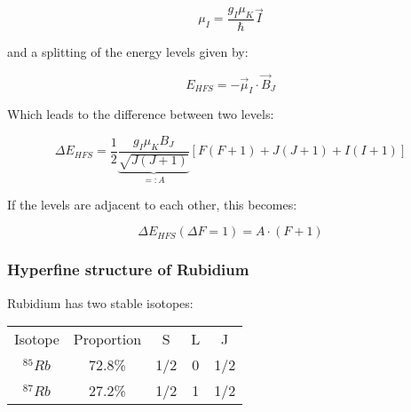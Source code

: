 $$\mu_I = \frac{g_I\mu_K}{\hbar}\vec I$$

and a splitting of the energy levels given by:

$$E_{HFS} = -\vec\mu_I\cdot\vec B_J$$

Which leads to the difference between two levels:

$$\Delta E_{HFS} = \frac{1}{2}\underbrace{\frac{g_I\mu_KB_J}{\sqrt{J(J+1)}}}_{=:A}[F(F+1) + J(J+1) + I(I+1)]$$

If the levels are adjacent to each other, this becomes:

\begin{equation} \Delta E_{HFS}(\Delta F = 1) = A\cdot (F+1) \end{equation} 

\subsubsection{Hyperfine structure of Rubidium}

Rubidium has two stable isotopes:

\begin{center}
\begin{tabular}[H]{c c c c c}
Isotope & Proportion &  S & L & J \\
 $^{85}Rb$ & 72.8\% & 1/2 & 0 & 1/2 \\
 $^{87}Rb$ & 27.2\% & 1/2 & 1 & 1/2 \\
\end{tabular}
\end{center}

























